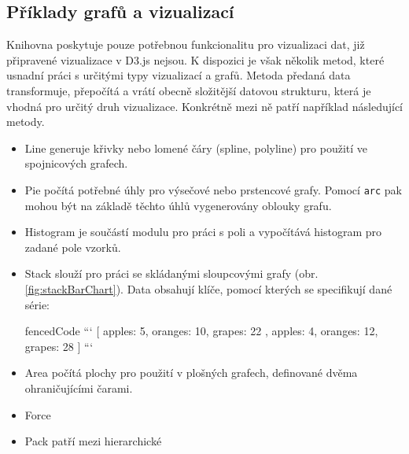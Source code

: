 \documentclass[
  digital, %
  oneside, %
  table,   %
  nolof,     %
  nolot,     %
]{fithesis3}
\begin{document}
\subsection{Příklady grafů a vizualizací}
Knihovna poskytuje pouze potřebnou funkcionalitu pro vizualizaci dat, již připravené vizualizace v D3.js nejsou. K dispozici je však několik metod, které usnadní práci s určitými typy vizualizací a grafů. Metoda předaná data transformuje, přepočítá a vrátí obecně složitější datovou strukturu, která je vhodná pro určitý druh vizualizace. Konkrétně mezi ně patří například následující metody. \cite{d3APIReference}
\begin{itemize}
  \item Line generuje křivky nebo lomené čáry (spline, polyline) pro použití ve spojnicových grafech.
  \item Pie počítá potřebné úhly pro výsečové nebo prstencové grafy. Pomocí \verb|arc| pak mohou být na základě těchto úhlů vygenerovány oblouky grafu.
  \item Histogram je součástí modulu pro práci s poli a vypočítává histogram pro zadané pole vzorků.
  \item Stack slouží pro práci se skládanými sloupcovými grafy (obr. \ref{fig:stackBarChart}). Data obsahují klíče, pomocí kterých se specifikují dané série:
\begin{markdown*}{
  fencedCode
}
```
	[{ apples: 5, oranges: 10, grapes: 22 },
	{ apples: 4, oranges: 12, grapes: 28 }]
```
\end{markdown*}
  \item Area počítá plochy pro použití v plošných grafech, definované dvěma ohraničujícími čarami.
  \item Force
  \item Pack patří mezi hierarchické
\end{itemize}
\end{document}
